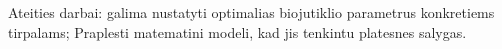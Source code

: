 \documentclass[12pt, a4paper, lithuanian]{article}
\begin{document}
Ateities darbai: galima nustatyti optimalias biojutiklio parametrus konkretiems
tirpalams; Praplesti matematini modeli, kad jis tenkintu platesnes salygas.

 
% 
% 
% 




%
\end{document}
